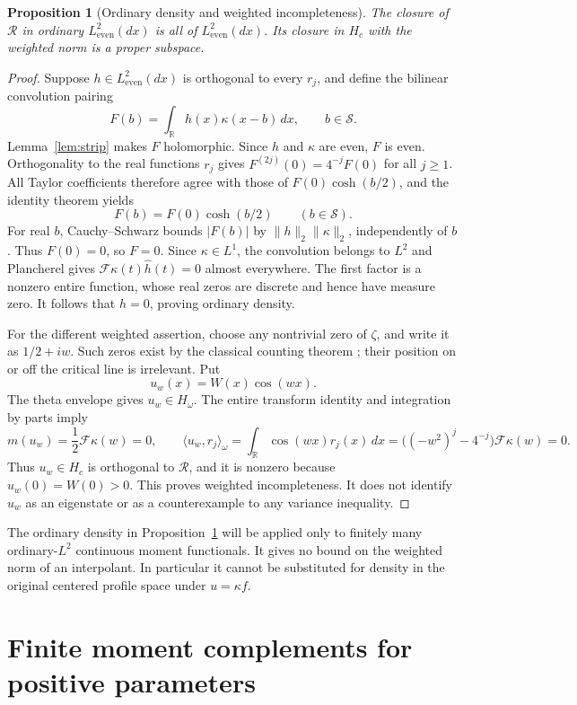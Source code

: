 \documentclass[11pt,a4paper]{article}
\numberwithin{equation}{section}
\newtheorem{proposition}[theorem]{Proposition}
\theoremstyle{remark}
\newcommand{\R}{\mathbb R}
\newcommand{\Le}{L^2_{\mathrm{even}}(dx)}
\newcommand{\Hw}{H_\omega}
\newcommand{\ip}[2]{\langle #1,#2\rangle}
\newcommand{\norm}[1]{\lVert #1\rVert}
\newcommand{\Rcal}{\mathcal R}
\begin{document}
\begin{proposition}[Ordinary density and weighted incompleteness]\label{prop:density}
The closure of $\Rcal$ in ordinary $\Le$ is all of $\Le$. Its closure in $H_c$ with the weighted norm is a proper subspace.
\end{proposition}
\begin{proof}
Suppose $h\in\Le$ is orthogonal to every $r_j$, and define the bilinear convolution pairing
\[
 F(b)=\int_\R h(x)\kappa(x-b)\,dx,\qquad b\in\mathcal S.
\]
Lemma~\ref{lem:strip} makes $F$ holomorphic. Since $h$ and $\kappa$ are even, $F$ is even. Orthogonality to the real functions $r_j$ gives
$F^{(2j)}(0)=4^{-j}F(0)$ for all $j\ge1$.
All Taylor coefficients therefore agree with those of $F(0)\cosh(b/2)$, and the identity theorem yields
\[
 F(b)=F(0)\cosh(b/2)\qquad(b\in\mathcal S).
\]
For real $b$, Cauchy--Schwarz bounds $|F(b)|$ by
$\norm h_2\norm\kappa_2$, independently of $b$. Thus $F(0)=0$, so $F=0$. Since $\kappa\in L^1$, the convolution belongs to $L^2$ and Plancherel gives
$\mathcal F\kappa(t)\widehat h(t)=0$ almost everywhere. The first factor is a nonzero entire function, whose real zeros are discrete and hence have measure zero. It follows that $h=0$, proving ordinary density.

For the different weighted assertion, choose any nontrivial zero of $\zeta$, and write it as $1/2+iw$. Such zeros exist by the classical counting theorem \cite{GarrettZeros}; their position on or off the critical line is irrelevant. Put
\[
 u_w(x)=W(x)\cos(wx).
\]
The theta envelope gives $u_w\in\Hw$. The entire transform identity and integration by parts imply
\[
 m(u_w)=\frac12\mathcal F\kappa(w)=0,\qquad
 \ip{u_w}{r_j}_\omega
 =\int_\R\cos(wx)r_j(x)\,dx
 =\bigl((-w^2)^j-4^{-j}\bigr)\mathcal F\kappa(w)=0.
\]
Thus $u_w\in H_c$ is orthogonal to $\Rcal$, and it is nonzero because $u_w(0)=W(0)>0$. This proves weighted incompleteness. It does not identify $u_w$ as an eigenstate or as a counterexample to any variance inequality.
\end{proof}

The ordinary density in Proposition~\ref{prop:density} will be applied only to finitely many ordinary-$L^2$ continuous moment functionals. It gives no bound on the weighted norm of an interpolant. In particular it cannot be substituted for density in the original centered profile space under $u=\kappa f$.

\section{Finite moment complements for positive parameters}\label{sec:moments}
\end{document}
